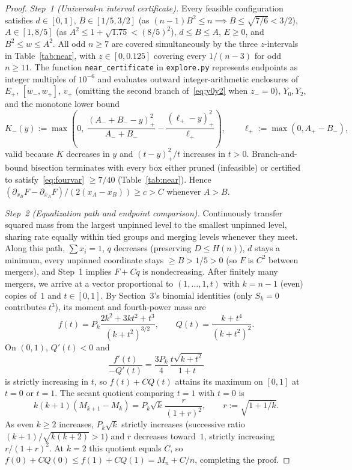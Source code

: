 \documentclass[11pt]{article}
\theoremstyle{plain}
\theoremstyle{definition}
\theoremstyle{remark}
\begin{document}
\begin{proof}
\emph{Step~1 (Universal-$n$ interval certificate).}
Every feasible configuration satisfies $d \in [0, 1]$, $B \in [1/5, 3/2]$ (as $(n - 1)B^2 \le n \implies B \le \sqrt{7/6} < 3/2$), $A \in [1, 8/5]$ (as $A^2 \le 1 + \sqrt{1.75} < (8/5)^2$), $d \le B \le A$, $E \ge 0$, and $B^2 \le w \le A^2$.
All odd $n \ge 7$ are covered simultaneously by the three $z$-intervals in Table~\ref{tab:near}, with $z \in [0, 0.125]$ covering every $1/(n - 3)$ for odd $n \ge 11$.
The function \texttt{near\_certificate} in \texttt{explore.py} represents endpoints as integer multiples of $10^{-6}$ and evaluates outward integer-arithmetic enclosures of $E_+$, $[w_-, w_+]$, $v_+$ (omitting the second branch of~\eqref{eq:y0y2} when $z_- = 0$), $Y_0, Y_2$, and the monotone lower bound
\[
K_-(y) := \max\!\left(0,\; \frac{(A_- + B_- - y)_+^2}{A_- + B_-} - \frac{(\ell_+ - y)_+^2}{\ell_+}\right), \qquad \ell_+ := \max(0, A_+ - B_-),
\]
valid because $K$ decreases in $y$ and $(t - y)_+^2/t$ increases in $t > 0$.
Branch-and-bound bisection terminates with every box either pruned (infeasible) or certified to satisfy~\eqref{eq:fourvar} $\ge 7/40$ (Table~\ref{tab:near}).
Hence $(\partial_{x_B} F - \partial_{x_A} F)/(2(x_A - x_B)) \ge c > C$ whenever $A > B$.

\emph{Step~2 (Equalization path and endpoint comparison).}
Continuously transfer squared mass from the largest unpinned level to the smallest unpinned level, sharing rate equally within tied groups and merging levels whenever they meet.
Along this path, $\sum x_i = 1$, $q$ decreases (preserving $D \le H(n)$), $d$ stays a minimum, every unpinned coordinate stays $\ge B > 1/5 > 0$ (so $F$ is $C^2$ between mergers), and Step~1 implies $F + Cq$ is nondecreasing.
After finitely many mergers, we arrive at a vector proportional to $(1, \dots, 1, t)$ with $k = n - 1$ (even) copies of~$1$ and $t \in [0, 1]$.
By Section~3's binomial identities (only $S_k = 0$ contributes $t^3$), its moment and fourth-power mass are
\[
f(t) = P_k\frac{2k^2 + 3kt^2 + t^3}{(k + t^2)^{3/2}}, \qquad Q(t) = \frac{k + t^4}{(k + t^2)^2}.
\]
On $(0, 1)$, $Q'(t) < 0$ and
\[
\frac{f'(t)}{-Q'(t)} = \frac{3P_k}{4}\,\frac{t\sqrt{k + t^2}}{1 + t}
\]
is strictly increasing in $t$, so $f(t) + CQ(t)$ attains its maximum on $[0, 1]$ at $t = 0$ or $t = 1$.
The secant quotient comparing $t = 1$ with $t = 0$ is
\[
k(k + 1)(M_{k+1} - M_k) = P_k\sqrt{k}\,\frac{r}{(1 + r)^2}, \qquad r := \sqrt{1 + 1/k}.
\]
As even $k \ge 2$ increases, $P_k\sqrt{k}$ strictly increases (successive ratio $(k + 1)/\sqrt{k(k + 2)} > 1$) and $r$ decreases toward~$1$, strictly increasing $r/(1 + r)^2$.
At $k = 2$ this quotient equals $C$, so $f(0) + CQ(0) \le f(1) + CQ(1) = M_n + C/n$, completing the proof.
\end{proof}
\end{document}
